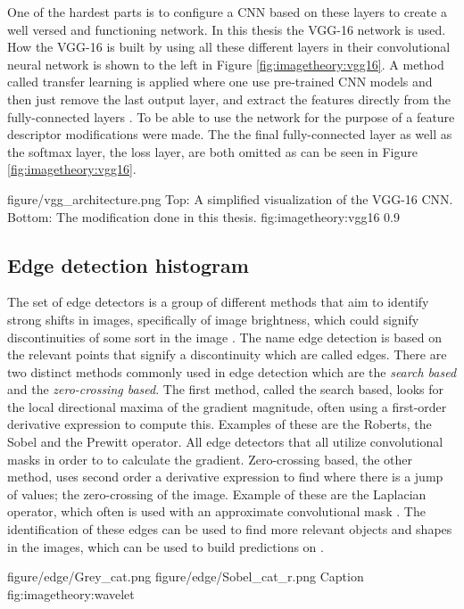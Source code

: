 One of the hardest parts is to configure a CNN based on these layers to create a well versed and functioning network. In this thesis the VGG-16 network is used. How the VGG-16 is built by using all these different layers in their convolutional neural network is shown to the left in Figure \ref{fig:imagetheory:vgg16}. A method called transfer learning is applied where one use pre-trained CNN models and then just remove the last output layer, and extract the features directly from the fully-connected layers \cite{koskela2014convolutional}. To be able to use the network for the purpose of a feature descriptor modifications were made. The the final fully-connected layer as well as the softmax layer, the loss layer, are both omitted as can be seen in Figure \ref{fig:imagetheory:vgg16}. 

\singlefigure
{figure/vgg_architecture.png}
{Top: A simplified visualization of the VGG-16 CNN. Bottom: The modification done in this thesis.}
{fig:imagetheory:vgg16}
{0.9}

\subsection{Edge detection histogram}
\label{sec:sob_feature}
The set of edge detectors is a group of different methods that aim to identify strong shifts in images, specifically of image brightness, which could signify discontinuities of some sort in the image \cite{canny1986computational}. The name edge detection is based on the relevant points that signify a discontinuity which are called edges. There are two distinct methods commonly used in edge detection which are the \emph{search based} and the \emph{zero-crossing based}. The first method, called the search based, looks for the local directional maxima of the gradient magnitude, often using a first-order derivative expression to compute this. Examples of these are the Roberts, the Sobel  and the Prewitt operator. All edge detectors that all utilize convolutional masks in order to to calculate the gradient. Zero-crossing based, the other method, uses second order a derivative expression to find where there is a jump of values; the zero-crossing of the image. Example of these are the Laplacian operator, which often is used with an approximate convolutional mask \cite{jain1995machine}. The identification of these edges can be used to find more relevant objects and shapes in the images, which can be used to build predictions on \cite{maini2009study}. 

\twofigure
{figure/edge/Grey_cat.png}
{figure/edge/Sobel_cat_r.png}
{Caption}
{fig:imagetheory:wavelet} 
